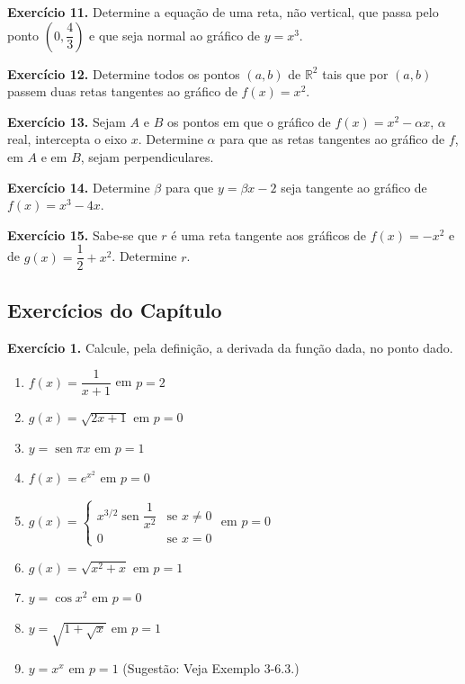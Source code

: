 \documentclass[12pt,a4paper]{article}
\begin{document}
\vspace{0.5cm}
\noindent\textbf{Exercício 11.}
Determine a equação de uma reta, não vertical, que passa pelo ponto $\left(0, \dfrac{4}{3}\right)$ e que seja normal ao gráfico de $y = x^3$.

\vspace{0.5cm}
\noindent\textbf{Exercício 12.}
Determine todos os pontos $(a, b)$ de $\mathbb{R}^2$ tais que por $(a, b)$ passem duas retas tangentes ao gráfico de $f(x) = x^2$.

\vspace{0.5cm}
\noindent\textbf{Exercício 13.}
Sejam $A$ e $B$ os pontos em que o gráfico de $f(x) = x^2 - \alpha x$, $\alpha$ real, intercepta o eixo $x$. Determine $\alpha$ para que as retas tangentes ao gráfico de $f$, em $A$ e em $B$, sejam perpendiculares.

\vspace{0.5cm}
\noindent\textbf{Exercício 14.}
Determine $\beta$ para que $y = \beta x - 2$ seja tangente ao gráfico de $f(x) = x^3 - 4x$.

\vspace{0.5cm}
\noindent\textbf{Exercício 15.}
Sabe-se que $r$ é uma reta tangente aos gráficos de $f(x) = -x^2$ e de $g(x) = \dfrac{1}{2} + x^2$. Determine $r$.

\subsection{Exercícios do Capítulo}
\vspace{0.5cm}
\noindent\textbf{Exercício 1.} Calcule, pela definição, a derivada da função dada, no ponto dado.
\begin{enumerate}
    \renewcommand{\theenumi}{\alph{enumi}}
    \renewcommand{\labelenumi}{\theenumi)}
    \item $f(x) = \dfrac{1}{x + 1}$ em $p = 2$
    \item $g(x) = \sqrt{2x + 1}$ em $p = 0$
    \item $y = \operatorname{sen} \pi x$ em $p = 1$
    \item $f(x) = e^{x^2}$ em $p = 0$
    \item $g(x) = \begin{cases} x^{3/2} \operatorname{sen} \dfrac{1}{x^2} & \text{se } x \neq 0 \\ 0 & \text{se } x = 0 \end{cases}$ em $p = 0$
    \item $g(x) = \sqrt{x^2 + x}$ em $p = 1$
    \item $y = \cos x^2$ em $p = 0$
    \item $y = \sqrt{1 + \sqrt{x}}$ em $p = 1$
    \item $y = x^x$ em $p = 1$ (Sugestão: Veja Exemplo 3-6.3.)
\end{enumerate}
\end{document}

